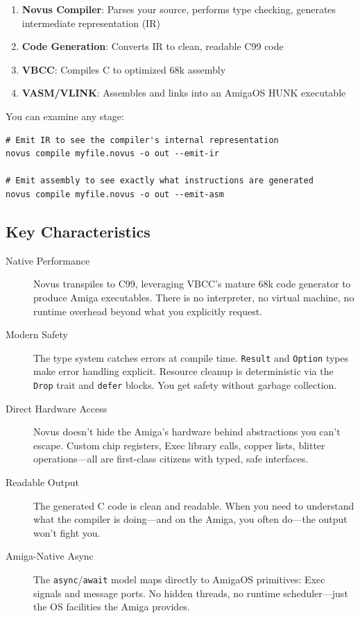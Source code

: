 \begin{enumerate}
    \item \textbf{Novus Compiler}: Parses your source, performs type checking, generates intermediate representation (IR)
    \item \textbf{Code Generation}: Converts IR to clean, readable C99 code
    \item \textbf{VBCC}: Compiles C to optimized 68k assembly
    \item \textbf{VASM/VLINK}: Assembles and links into an AmigaOS HUNK executable
\end{enumerate}

You can examine any stage:

\begin{lstlisting}[style=bash]
# Emit IR to see the compiler's internal representation
novus compile myfile.novus -o out --emit-ir

# Emit assembly to see exactly what instructions are generated
novus compile myfile.novus -o out --emit-asm
\end{lstlisting}

\subsection{Key Characteristics}

\begin{description}
    \item[Native Performance] Novus transpiles to C99, leveraging VBCC's mature 68k code generator to produce Amiga executables. There is no interpreter, no virtual machine, no runtime overhead beyond what you explicitly request.

    \item[Modern Safety] The type system catches errors at compile time. \texttt{Result} and \texttt{Option} types make error handling explicit. Resource cleanup is deterministic via the \texttt{Drop} trait and \texttt{defer} blocks. You get safety without garbage collection.

    \item[Direct Hardware Access] Novus doesn't hide the Amiga's hardware behind abstractions you can't escape. Custom chip registers, Exec library calls, copper lists, blitter operations---all are first-class citizens with typed, safe interfaces.

    \item[Readable Output] The generated C code is clean and readable. When you need to understand what the compiler is doing---and on the Amiga, you often do---the output won't fight you.

    \item[Amiga-Native Async] The \texttt{async}/\texttt{await} model maps directly to AmigaOS primitives: Exec signals and message ports. No hidden threads, no runtime scheduler---just the OS facilities the Amiga provides.
\end{description}

